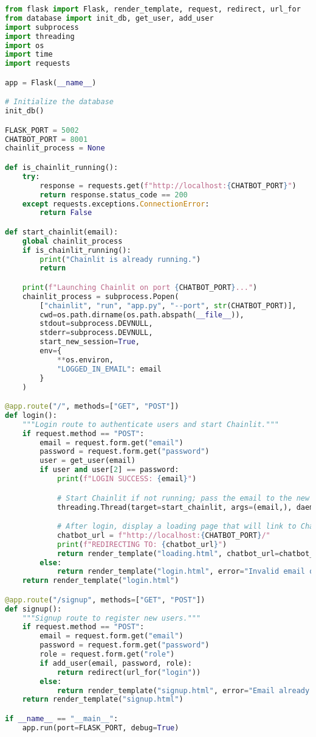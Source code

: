 \begin{lstlisting}[language=Python, caption={User authentication and role assignment code}, basicstyle=\small\ttfamily]
from flask import Flask, render_template, request, redirect, url_for
from database import init_db, get_user, add_user
import subprocess
import threading
import os
import time
import requests

app = Flask(__name__)

# Initialize the database
init_db()

FLASK_PORT = 5002
CHATBOT_PORT = 8001
chainlit_process = None

def is_chainlit_running():
    try:
        response = requests.get(f"http://localhost:{CHATBOT_PORT}")
        return response.status_code == 200
    except requests.exceptions.ConnectionError:
        return False

def start_chainlit(email):
    global chainlit_process
    if is_chainlit_running():
        print("Chainlit is already running.")
        return

    print(f"Launching Chainlit on port {CHATBOT_PORT}...")
    chainlit_process = subprocess.Popen(
        ["chainlit", "run", "app.py", "--port", str(CHATBOT_PORT)],
        cwd=os.path.dirname(os.path.abspath(__file__)),
        stdout=subprocess.DEVNULL,
        stderr=subprocess.DEVNULL,
        start_new_session=True,
        env={
            **os.environ,
            "LOGGED_IN_EMAIL": email
        }
    )

@app.route("/", methods=["GET", "POST"])
def login():
    """Login route to authenticate users and start Chainlit."""
    if request.method == "POST":
        email = request.form.get("email")
        password = request.form.get("password")
        user = get_user(email)
        if user and user[2] == password:
            print(f"LOGIN SUCCESS: {email}")

            # Start Chainlit if not running; pass the email to the new process
            threading.Thread(target=start_chainlit, args=(email,), daemon=True).start()

            # After login, display a loading page that will link to Chainlit
            chatbot_url = f"http://localhost:{CHATBOT_PORT}/"
            print(f"REDIRECTING TO: {chatbot_url}")
            return render_template("loading.html", chatbot_url=chatbot_url)
        else:
            return render_template("login.html", error="Invalid email or password.")
    return render_template("login.html")

@app.route("/signup", methods=["GET", "POST"])
def signup():
    """Signup route to register new users."""
    if request.method == "POST":
        email = request.form.get("email")
        password = request.form.get("password")
        role = request.form.get("role")
        if add_user(email, password, role):
            return redirect(url_for("login"))
        else:
            return render_template("signup.html", error="Email already registered.")
    return render_template("signup.html")

if __name__ == "__main__":
    app.run(port=FLASK_PORT, debug=True)
\end{lstlisting}

